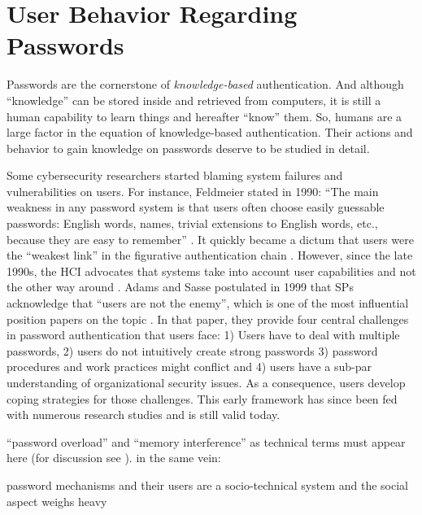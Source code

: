 	
\section{User Behavior Regarding Passwords}\label{sec:rw:user-behavior}
Passwords are the cornerstone of \textit{knowledge-based} authentication. And although ``knowledge'' can be stored inside and retrieved from computers, it is still a human capability to learn things and hereafter ``know'' them. So, humans are a large factor in the equation of knowledge-based authentication. Their actions and behavior to gain knowledge on passwords deserve to be studied in detail. 

Some cybersecurity researchers started blaming system failures and vulnerabilities on users. For instance, Feldmeier \etal stated in 1990: ``The main weakness in any password system is that users often choose easily guessable passwords: English words, names, trivial extensions to English words, etc., because they are easy to remember'' \cite{Feldmeier1990UnixPasswordSecurity}. It quickly became a dictum that users were the ``weakest link'' in the figurative authentication chain \cite{Sasse2001WeakestLink}. However, since the late 1990s, the \gls{HCI} advocates that systems take into account user capabilities and not the other way around \cite{Sasse2005UsableSecurityPosition}. Adams and Sasse postulated in 1999 that \glspl{SP} acknowledge that ``users are not the enemy'', which is one of the most influential position papers on the topic \cite{Adams1999UsersEnemy}. In that paper, they provide four central challenges in password authentication that users face: 1) Users have to deal with multiple passwords, 2) users do not intuitively create strong passwords 3) password procedures and work practices might conflict and 4) users have a sub-par understanding of organizational security issues. As a consequence, users develop coping strategies for those challenges. This early framework has since been fed with numerous research studies and is still valid today. 

``password overload'' and ``memory interference'' as technical terms must appear here (for discussion see \cite{Yang2016MnemonicSentenceBased}). in the same vein: \cite{Chiasson2009InterferencesGraphical}

password mechanisms and their users are a socio-technical system and the social aspect weighs heavy \cite{Weirich2001PrettyGoodPersuasion}

